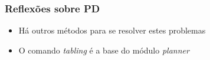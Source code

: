 \begin{frame}[fragile]
\frametitle{Reflexões sobre PD}


\begin{itemize}
  \item Há outros métodos para se resolver estes problemas

  \pause
  \item O comando \textit{tabling} é a base do módulo \textit{planner}

\end{itemize}

\end{frame}
